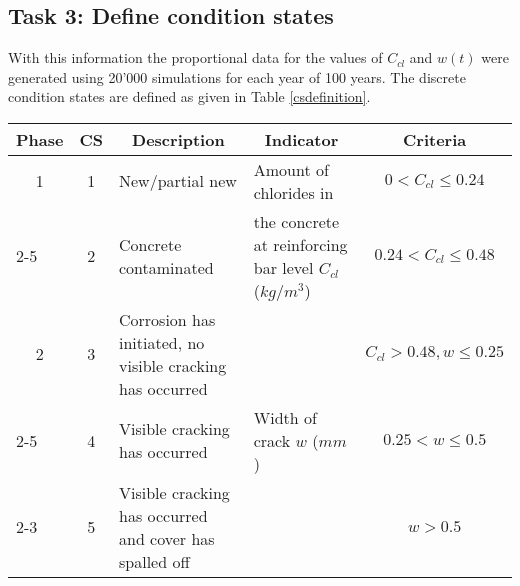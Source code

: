 \documentclass[Journal]{ascelike}
\begin{document}
\subsection{Task 3: Define condition states}

With this information the proportional data for the values of $C_{cl}$
and $w(t)$ were generated using 20'000 simulations for each year
of 100 years. The discrete condition states are defined as given in
Table \ref{csdefinition}.

\begin{table*}
\centering \caption{{\footnotesize{}Definition of condition states}}
\label{csdefinition}
{\footnotesize \par}
{\footnotesize{} %
}%

\begin{tabular}{|l|l|p{3.5cm}|p{5.5cm}|l|}
\hline 
\multicolumn{1}{|c|}{{\footnotesize{}Phase}} & \multicolumn{1}{c|}{{\footnotesize{}CS}} & \multicolumn{1}{c|}{{\footnotesize{}Description}} & \multicolumn{1}{c|}{{\footnotesize{}Indicator}} & \multicolumn{1}{c|}{{\footnotesize{}Criteria}}\tabularnewline
\hline 
\multicolumn{1}{|c|}{{\footnotesize{}1}} & \multicolumn{1}{c|}{{\footnotesize{}1}} & {\footnotesize{}New/partial new } & {\footnotesize{}Amount of chlorides in } & \multicolumn{1}{c|}{{\footnotesize{}$0<C_{cl}\le0.24$}}\tabularnewline
\cline{2-5} 
\multicolumn{1}{|c|}{} & \multicolumn{1}{c|}{{\footnotesize{}2}} & {\footnotesize{}Concrete contaminated } & {\footnotesize{}the concrete at reinforcing bar level $C_{cl}$ ($kg/m^{3}$) } & \multicolumn{1}{c|}{{\footnotesize{}$0.24<C_{cl}\le0.48$}}\tabularnewline
\hline 
\multicolumn{1}{|c|}{{\footnotesize{}2}} & \multicolumn{1}{c|}{{\footnotesize{}3}} & {\footnotesize{}Corrosion has initiated, no visible cracking has occurred } & \multicolumn{1}{c|}{} & \multicolumn{1}{c|}{{\footnotesize{}$C_{cl}>0.48,w\le0.25$}}\tabularnewline
\cline{2-5} 
\multicolumn{1}{|c|}{} & \multicolumn{1}{c|}{{\footnotesize{}4}} & {\footnotesize{}Visible cracking has occurred } & {\footnotesize{}Width of crack $w$ ($mm$) } & \multicolumn{1}{c|}{{\footnotesize{}$0.25<w\le0.5$}}\tabularnewline
\cline{2-3} \cline{5-5} 
\multicolumn{1}{|c|}{} & \multicolumn{1}{c|}{{\footnotesize{}5}} & {\footnotesize{}Visible cracking has occurred and cover has spalled
off } & \multicolumn{1}{c|}{} & \multicolumn{1}{c|}{{\footnotesize{}$w>0.5$}}\tabularnewline
\hline 
\end{tabular}{\footnotesize \par}
\end{table*}
\end{document}
